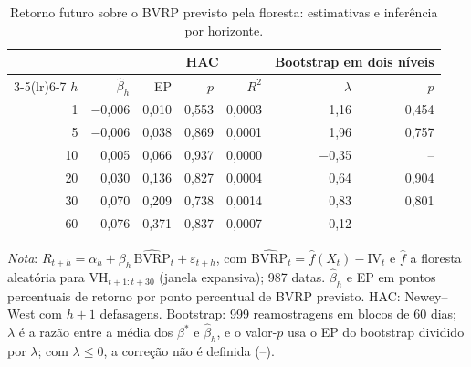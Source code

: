 \begin{table}[H]
\centering
\small
\caption{Retorno futuro sobre o BVRP previsto pela floresta: estimativas e inferência por horizonte.}
\label{tab:retnl-principal}
\begin{tabular}{rrrrrrr}
\toprule
 & & \multicolumn{3}{c}{HAC} & \multicolumn{2}{c}{Bootstrap em dois níveis} \\ \cmidrule(lr){3-5}\cmidrule(lr){6-7}
$h$ & $\hat\beta_h$ & EP & $p$ & $R^2$ & $\lambda$ & $p$ \\
\midrule
1 & $-$0{,}006 & 0{,}010 & 0{,}553 & 0{,}0003 & 1{,}16 & 0{,}454 \\
5 & $-$0{,}006 & 0{,}038 & 0{,}869 & 0{,}0001 & 1{,}96 & 0{,}757 \\
10 & 0{,}005 & 0{,}066 & 0{,}937 & 0{,}0000 & $-$0{,}35 & -- \\
20 & 0{,}030 & 0{,}136 & 0{,}827 & 0{,}0004 & 0{,}64 & 0{,}904 \\
30 & 0{,}070 & 0{,}209 & 0{,}738 & 0{,}0014 & 0{,}83 & 0{,}801 \\
60 & $-$0{,}076 & 0{,}371 & 0{,}837 & 0{,}0007 & $-$0{,}12 & -- \\
\bottomrule
\end{tabular}
\par\smallskip
\parbox{0.95\linewidth}{\footnotesize\textit{Nota}: $R_{t+h} = \alpha_h + \beta_h\,\widehat{\text{BVRP}}_t + \varepsilon_{t+h}$, com $\widehat{\text{BVRP}}_t = \hat f(X_t) - \text{IV}_t$ e $\hat f$ a floresta aleatória para $\text{VH}_{t+1:t+30}$ (janela expansiva); 987 datas. $\hat\beta_h$ e EP em pontos percentuais de retorno por ponto percentual de BVRP previsto. HAC: Newey--West com $h+1$ defasagens. Bootstrap: 999 reamostragens em blocos de 60 dias; $\lambda$ é a razão entre a média dos $\beta^*$ e $\hat\beta_h$, e o valor-$p$ usa o EP do bootstrap dividido por $\lambda$; com $\lambda \le 0$, a correção não é definida (--).}
\end{table}
